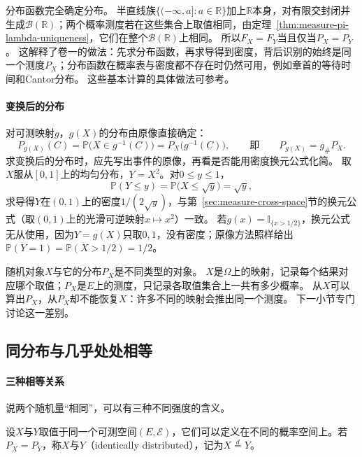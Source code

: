分布函数完全确定分布。
半直线族$\{(-\infty,a]:a\in\mathbb R\}$加上$\mathbb R$本身，对有限交封闭并生成$\mathcal B(\mathbb R)$；两个概率测度若在这些集合上取值相同，由定理~\ref{thm:measure-pi-lambda-uniqueness}，它们在整个$\mathcal B(\mathbb R)$上相同。
所以$F_X=F_Y$当且仅当$P_X=P_Y$。
这解释了卷一的做法：先求分布函数，再求导得到密度，背后识别的始终是同一个测度$P_X$；分布函数在概率表与密度都不存在时仍然可用，例如章首的等待时间和Cantor分布。
这些基本计算的具体做法可参考。

\paragraph{变换后的分布}
对可测映射$g$，$g(X)$的分布由原像直接确定：
\[
  P_{g(X)}(C)=\mathbb P\bigl(X\in g^{-1}(C)\bigr)=P_X\bigl(g^{-1}(C)\bigr),
  \qquad\text{即}\qquad P_{g(X)}=g_\#P_X.
\]
求变换后的分布时，应先写出事件的原像，再看是否能用密度换元公式化简。
取$X$服从$[0,1]$上的均匀分布，$Y=X^2$。对$0\le y\le1$，
\[
  \mathbb P(Y\le y)=\mathbb P\bigl(X\le\sqrt y\bigr)=\sqrt y,
\]
求导得$Y$在$(0,1)$上的密度$1/(2\sqrt y)$，与第~\ref{sec:measure-cross-space}节的换元公式（取$(0,1)$上的光滑可逆映射$x\mapsto x^2$）一致。
若$g(x)=\mathbb I_{\{x>1/2\}}$，换元公式无从使用，因为$Y=g(X)$只取$0,1$，没有密度；原像方法照样给出$\mathbb P(Y=1)=\mathbb P(X>1/2)=1/2$。

随机对象$X$与它的分布$P_X$是不同类型的对象。
$X$是$\Omega$上的映射，记录每个结果对应哪个取值；$P_X$是$E$上的测度，只记录各取值集合上一共有多少概率。
从$X$可以算出$P_X$，从$P_X$却不能恢复$X$：许多不同的映射会推出同一个测度。
下一小节专门讨论这一差别。

\subsection{同分布与几乎处处相等}

\paragraph{三种相等关系}
说两个随机量“相同”，可以有三种不同强度的含义。

\begin{definition}[同分布]
\label{def:pmod-identical-distribution}
设$X$与$Y$取值于同一个可测空间$(E,\mathcal E)$，它们可以定义在不同的概率空间上。若$P_X=P_Y$，称$X$与$Y$（identically distributed），记为$X\overset{d}{=}Y$。
\end{definition}

